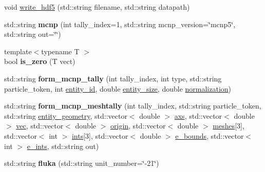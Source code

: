 \begin{DoxyCompactItemize}
\item 
void \hyperlink{classpyne_1_1_tally_abc2ff249b426b47b2beb1bfeeacbbe62}{write\+\_\+hdf5} (std\+::string filename, std\+::string datapath)
\item 
\mbox{\label{classpyne_1_1_tally_a4fe1fc5c8f7ffe65bb72c9b24dc2e526}} 
std\+::string {\bfseries mcnp} (int tally\+\_\+index=1, std\+::string mcnp\+\_\+version=\char`\"{}mcnp5\char`\"{}, std\+::string out=\char`\"{}\char`\"{})
\item 
\mbox{\label{classpyne_1_1_tally_a62d6fda59dd1955c846572a32813dd73}} 
{\footnotesize template$<$typename T $>$ }\\bool {\bfseries is\+\_\+zero} (T vect)
\item 
\mbox{\label{classpyne_1_1_tally_ab51fc7ba31fa0f061a6bf738a9092849}} 
std\+::string {\bfseries form\+\_\+mcnp\+\_\+tally} (int tally\+\_\+index, int type, std\+::string particle\+\_\+token, int \hyperlink{classpyne_1_1_tally_a84aa789b361f4323e2906a411ef3a791}{entity\+\_\+id}, double \hyperlink{classpyne_1_1_tally_a1a19c1b79ed25ea2a3d08b15b30bbea1}{entity\+\_\+size}, double \hyperlink{classpyne_1_1_tally_a8ff1eb44926ad1e415386983679c78f1}{normalization})
\item 
\mbox{\label{classpyne_1_1_tally_a30ebf619724b7e5541941400da2f201d}} 
std\+::string {\bfseries form\+\_\+mcnp\+\_\+meshtally} (int tally\+\_\+index, std\+::string particle\+\_\+token, std\+::string \hyperlink{classpyne_1_1_tally_a297bfdf2ab5822812c7c1b5c4eb03a2a}{entity\+\_\+geometry}, std\+::vector$<$ double $>$ \hyperlink{classpyne_1_1_tally_a883412bf93615a0cf19f0404b5bf6cba}{axs}, std\+::vector$<$ double $>$ \hyperlink{classpyne_1_1_tally_af5c2fcb0cec3b5886e4630f5ab6f5dc7}{vec}, std\+::vector$<$ double $>$ \hyperlink{classpyne_1_1_tally_a212b4cbcac800f5812b7698e9827eed3}{origin}, std\+::vector$<$ double $>$ \hyperlink{classpyne_1_1_tally_a9060e0ccb9e0bd786cd32b217d96647a}{meshes}\mbox{[}3\mbox{]}, std\+::vector$<$ int $>$ \hyperlink{classpyne_1_1_tally_ac7c55b8fbc45b4399a27953e7981b06c}{ints}\mbox{[}3\mbox{]}, std\+::vector$<$ double $>$ \hyperlink{classpyne_1_1_tally_ab5e705bcd3521bc0946ccb026077197c}{e\+\_\+bounds}, std\+::vector$<$ int $>$ \hyperlink{classpyne_1_1_tally_ac92555231fcf5dcea1781831ad902e87}{e\+\_\+ints}, std\+::string out)
\item 
\mbox{\label{classpyne_1_1_tally_ae9393f61301395a0994c1a39b1dc29ad}} 
std\+::string {\bfseries fluka} (std\+::string unit\+\_\+number=\char`\"{}-\/21\char`\"{})
\end{DoxyCompactItemize}
